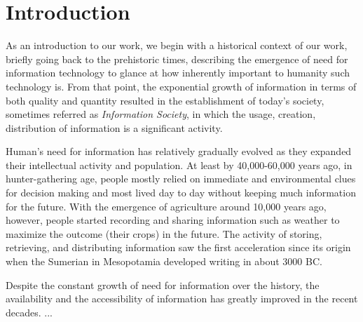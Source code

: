 \normallinespacing

\chapter{Introduction}


As an introduction to our work, we begin with a historical context of our work, briefly going back to the prehistoric times, describing the emergence of need for information technology to glance at how inherently important to humanity such technology is. From that point, the exponential growth of information in terms of both quality and quantity resulted in the establishment of today's society, sometimes referred as \textit{Information Society}, in which the usage, creation, distribution of information is a significant activity. 
 
Human's need for information has relatively gradually evolved as they expanded their intellectual activity and population.
At least by 40,000-60,000 years ago, in hunter-gathering age, people mostly relied on immediate and environmental clues for decision making and most lived day to day without keeping much information for the future. With the emergence of agriculture around 10,000 years ago, however, people started recording and sharing information such as weather to maximize the outcome (their crops) in the future. The activity of storing, retrieving, and distributing information saw the first acceleration since its origin when the Sumerian in Mesopotamia developed writing in about 3000 BC.

Despite the constant growth of need for information over the history, the availability and the accessibility of information has greatly improved in the recent decades. ...

